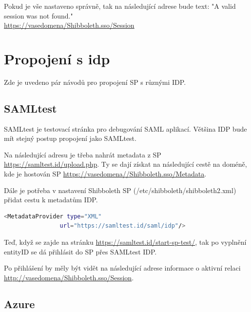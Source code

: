 Pokud je vše nastaveno správně, tak na následující adrese bude text: "A valid session was not found."\\
\url{https://vasedomena/Shibboleth.sso/Session}

\section{Propojení s idp}

Zde je uvedeno pár návodů pro propojení SP s různými IDP.

\subsection{SAMLtest}
SAMLtest je testovací stránka pro debugování SAML aplikací. Většina IDP bude mít stejný postup propojení jako SAMLtest.



Na následující adresu je třeba nahrát metadata z SP 
\url{https://samltest.id/upload.php}. Ty se dají získat na následující cestě na doméně, kde je hostován SP \url{https://vasedomena//Shibboleth.sso/Metadata}.

Dále je potřeba v nastavení Shibboleth SP (/etc/shibboleth/shibboleth2.xml) přidat cestu k metadatům IDP.
\begin{lstlisting}[language=Bash]
 <MetadataProvider type="XML"
                url="https://samltest.id/saml/idp"/>
\end{lstlisting}

Teď, když se zajde na stránku \url{https://samltest.id/start-sp-test/}, tak po vyplnění entityID se dá přihlásit do SP přes SAMLtest IDP.

Po přihlášení by měly být vidět na následující adrese informace o aktivní relaci \url{http://vasedomena/Shibboleth.sso/Session}.



\subsection{Azure}

